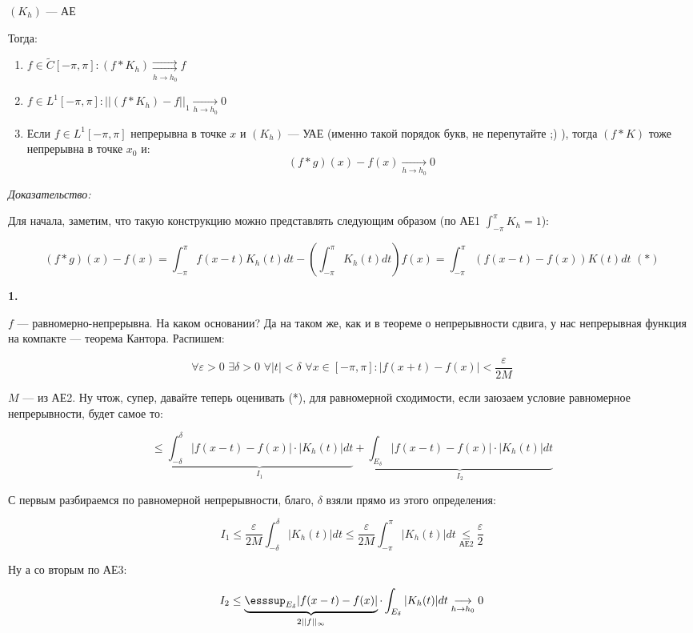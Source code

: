 \documentclass{article}
\def\dbl{\,\,}
\def\rsh#1{\underset{#1}{\rightrightarrows}}
\def\goesto#1{\underset{#1}{\longrightarrow}}
\begin{document}
$(K_h)$ --- АЕ

Тогда:

\begin{enumerate}
    \item $f \in \tilde{C}[-\pi, \pi]: (f * K_h) \rsh{h \rightarrow h_0} f$
    \item $f \in L^1[-\pi, \pi]: ||(f * K_h) - f||_1 \goesto{h \rightarrow h_0} 0$
    \item Если $f \in L^1[-\pi, \pi]$ непрерывна в точке $x$ и $(K_h)$ --- УАЕ (именно такой порядок букв, не перепутайте ;) ), тогда $(f * K)$ тоже непрерывна в точке $x_0$ и:
    \[(f * g)(x) - f(x) \goesto{h \rightarrow h_0} 0\]
\end{enumerate}

\textit{Доказательство:}

Для начала, заметим, что такую конструкцию можно представлять следующим образом (по АЕ1 $\int_{-\pi}^{\pi} K_h = 1$):

\[(f * g)(x) - f(x) = \int_{-\pi}^{\pi} f(x - t)K_h(t)dt - \left(\int_{-\pi}^{\pi} K_h(t) dt \right) f(x) = \int_{-\pi}^{\pi} (f(x - t) - f(x))K(t)dt \dbl (*)\]

\textbf{1.}

$f$ --- равномерно-непрерывна. На каком основании? Да на таком же, как и в теореме о непрерывности сдвига, у нас непрерывная функция на компакте --- теорема Кантора. Распишем:

\[\forall \varepsilon > 0 \dbl \exists \delta > 0 \dbl \forall |t| < \delta \dbl \forall x \in [-\pi, \pi] : |f(x + t) - f(x)| < \frac{\varepsilon}{2M}\]

$M$ --- из АЕ2. Ну чтож, супер, давайте теперь оценивать (*), для равномерной сходимости, если заюзаем условие равномерное непрерывности, будет самое то:

\[ \le \underbrace{\int_{-\delta}^{\delta} |f(x - t) - f(x)| \cdot |K_h(t)| dt}_{I_1} + \underbrace{\int_{E_\delta} |f(x - t) - f(x)| \cdot |K_h(t)| dt}_{I_2}\]

С первым разбираемся по равномерной непрерывности, благо, $\delta$ взяли прямо из этого определения:

\[ I_1 \le \frac{\varepsilon}{2M} \int_{-\delta}^{\delta} |K_h(t)|dt \le \frac{\varepsilon}{2M} \int_{-\pi}^{\pi} |K_h(t)| dt \underset{\text{АЕ2}}{\le} \frac{\varepsilon}{2}\]

Ну а со вторым по АЕ3:

\[I_2 \le \underbrace{\esssup_{E_\delta} |f(x - t) - f(x)|}_{2||f||_{\infty}} \cdot \int_{E_\delta} |K_h(t)| dt \goesto{h \rightarrow h_0} 0\]
\end{document}
